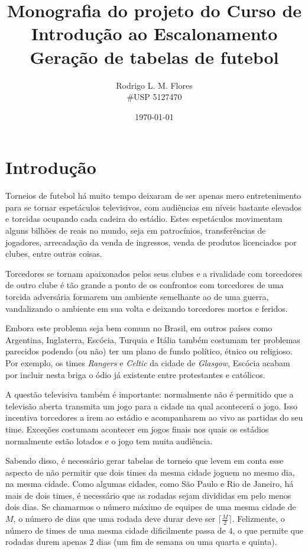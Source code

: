 \documentclass[a4paper,12pt,titlepage]{article}
\title{Monografia do projeto do Curso de Introdução ao Escalonamento \\ Geração de tabelas de futebol}
\author{Rodrigo L. M. Flores \\ \#USP 5127470}
\date{\today}
\begin{document}
\maketitle

\section{Introdução}

Torneios de futebol há muito tempo deixaram de ser apenas mero entretenimento para se tornar espetáculos televisivos,
com audiências em níveis bastante elevados e torcidas ocupando cada cadeira do estádio. Estes espetáculos movimentam
alguns bilhões de reais no mundo, seja em patrocínios, transferências de jogadores, arrecadação da venda de ingressos,
venda de produtos licenciados por clubes, entre outras coisas. 

Torcedores se tornam apaixonados pelos seus clubes e a rivalidade com torcedores de outro clube é tão grande a 
ponto de os confrontos com torcedores de uma torcida 
adversária formarem um ambiente semelhante ao de uma guerra, vandalizando o ambiente em sua volta e deixando  
torcedores mortos e feridos.

Embora este problema seja bem comum no Brasil, em outros países como Argentina, Inglaterra, Escócia, Turquia e Itália também costumam
ter problemas parecidos podendo (ou não) ter um plano de fundo político, étnico ou religioso. Por exemplo, os times \textit{Rangers} 
e \textit{Celtic} da cidade de \textit{Glasgow}, Escócia acabam por incluir nesta briga o ódio já existente 
entre protestantes e católicos. 

A questão televisiva também é importante: normalmente não é permitido que a televisão aberta transmita um jogo para a cidade 
na qual acontecerá o jogo. Isso incentiva torcedores a irem ao estádio e acompanharem ao vivo as partidas do seu time. Exceções
costumam acontecer em jogos finais nos quais os estádios normalmente estão lotados e o jogo tem muita audiência. 

Sabendo disso, é necessário gerar tabelas de torneio que levem em conta esse aspecto de não permitir que dois times da mesma cidade joguem 
no mesmo dia, na mesma cidade. Como algumas cidades, como São Paulo e Rio de Janeiro, há mais de dois times, 
é necessário que as rodadas sejam divididas em pelo menos dois dias.  Se chamarmos o número máximo de equipes de uma mesma cidade
de $M$, o número de dias que uma rodada deve durar deve ser $\lceil\frac{M}{2}\rceil$. Felizmente, o número de times de uma
mesma cidade dificilmente passa de $4$, o que permite que rodadas durem apenas $2$ dias (um fim de semana ou uma quarta e quinta).
\end{document}
